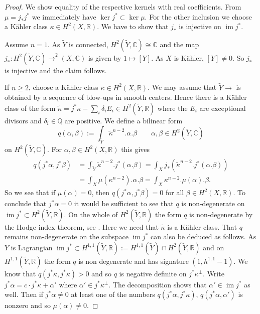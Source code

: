 \documentclass[a4paper,11pt,final]{amsart}
\theoremstyle{plain}
\theoremstyle{definition}
\numberwithin{equation}{section}
\theoremstyle{remark}
\begin{document}
\begin{proof}
We show equality of the respective kernels with real coefficients. From $\mu = j_* j^*$ we immediately have $\ker j^* \subset \ker \mu$. For the other inclusion we choose a K\"ahler class $\kappa \in H^2(X,{{\mathbb R}})$. We have to show that $j_*$ is injective on ${\operatorname{im}} j^*$.

Assume $n=1$. As ${{\widetilde{Y}}}$ is connected, $H^2({{\widetilde{Y}}},{{\mathbb C}}){\cong} {{\mathbb C}}$ and the map $j_*:H^2({{\widetilde{Y}}},{{\mathbb C}}){\xrightarrow{\ \ }}^2(X,{{\mathbb C}})$ is given by $1\mapsto [Y]$. As $X$ is K\"ahler, $[Y]\neq 0$. So $j_*$ is injective and the claim follows.

If $n\geq 2$, choose a K\"ahler class $\kappa \in H^2(X,{{\mathbb R}})$. 
We may assume that ${{\widetilde{Y}}} {\xrightarrow{\ \ }}$ is obtained by a sequence of blow-ups in smooth centers. Hence there is a K\"ahler class of the form ${{\widetilde{\kappa}}} = j^* \kappa - \sum_{i}\delta_i E_i \in H^2({{\widetilde{Y}}},{{\mathbb R}})$ where the $E_i$ are exceptional divisors and $\delta_i \in {{\mathbb Q}}$ are positive.
We define a bilinear form 
\[
q(\alpha,\beta):=\int_{{\widetilde{Y}}} {{\widetilde{\kappa}}}^{n-2}.\alpha.\beta \qquad \alpha, \beta \in H^2({{\widetilde{Y}}},{{\mathbb C}})
\]
on $H^2({{\widetilde{Y}}},{{\mathbb C}})$. For $\alpha, \beta \in H^2(X,{{\mathbb R}})$ this gives
\[
\begin{aligned}
q(j^*\alpha, j^*\beta) &= \int_{{\widetilde{Y}}} {{\widetilde{\kappa}}}^{n-2}.j^*(\alpha.\beta) = \int_X j_*\left({{\widetilde{\kappa}}}^{n-2}.j^*(\alpha.\beta)\right)\\
& = \int_X\mu(\kappa^{n-2}).\alpha.\beta
 = \int_X\kappa^{n-2}.\mu(\alpha).\beta.
\end{aligned}
\]
So we see that if $\mu(\alpha)=0$, then $q(j^*\alpha, j^*\beta)=0$ for all $\beta \in H^2(X,{{\mathbb R}})$. To conclude that $j^*\alpha = 0$ it would be sufficient to see that $q$ is non-degenerate on ${\operatorname{im}} j^* \subset H^2({{\widetilde{Y}}},{{\mathbb R}})$. On the whole of $H^2({{\widetilde{Y}}},{{\mathbb R}})$ the form $q$ is non-degenerate by the Hodge index theorem, see \cite[Thm 6.33]{Vo1}. Here we need that ${{\widetilde{\kappa}}}$ is a K\"ahler class. That $q$ remains non-degenerate on the subspace ${\operatorname{im}} j^*$ can also be deduced as follows. As $Y$ is Lagrangian ${\operatorname{im}} j^* \subset H^{1,1}({{\widetilde{Y}}},{{\mathbb R}}):=H^{1,1}({{\widetilde{Y}}}) \cap H^2({{\widetilde{Y}}},{{\mathbb R}})$ and on $H^{1,1}({{\widetilde{Y}}},{{\mathbb R}})$ the form $q$ is non degenerate and has signature $(1,h^{1,1}-1)$. We know that $q(j^*\kappa,j^*\kappa) > 0$ and so $q$ is negative definite on $j^*\kappa^\perp$. Write $j^*\alpha = c \cdot j^*\kappa + \alpha'$ where $\alpha'\in j^*\kappa^\perp$. The decomposition shows that $\alpha' \in {\operatorname{im}} j^*$ as well. Then if $j^* \alpha \neq 0$ at least one of the numbers $q(j^*\alpha, j^*\kappa)$, $q(j^*\alpha, \alpha')$ is nonzero and so $\mu(\alpha)\neq 0$.
\end{proof}
\end{document}
